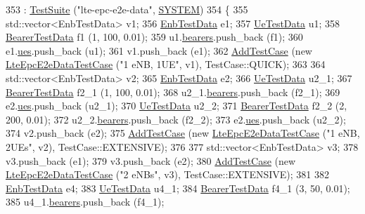 \begin{DoxyCode}
353   : \hyperlink{classns3_1_1TestSuite_a904b0c40583b744d30908aeb94636d1a}{TestSuite} (\textcolor{stringliteral}{"lte-epc-e2e-data"}, \hyperlink{classns3_1_1TestSuite_a1ebfcab34ec8161e085e8e3a1855eae0a90c5529a26ab3a5ffcc6e57040dbd82e}{SYSTEM})
354 \{  
355   std::vector<EnbTestData> v1;  
356   \hyperlink{structEnbTestData}{EnbTestData} e1;
357   \hyperlink{structUeTestData}{UeTestData} u1;
358   \hyperlink{structBearerTestData}{BearerTestData} f1 (1, 100, 0.01);
359   u1.\hyperlink{structUeTestData_ab02618dc9dfd673f397c313dae3df481}{bearers}.push\_back (f1);
360   e1.\hyperlink{structEnbTestData_a0b5de379df31368a33410980a16d2dd7}{ues}.push\_back (u1);
361   v1.push\_back (e1);
362   \hyperlink{classns3_1_1TestCase_a3718088e3eefd5d6454569d2e0ddd835}{AddTestCase} (\textcolor{keyword}{new} \hyperlink{classLteEpcE2eDataTestCase}{LteEpcE2eDataTestCase} (\textcolor{stringliteral}{"1 eNB, 1UE"}, v1), 
      TestCase::QUICK);
363 
364   std::vector<EnbTestData> v2;  
365   \hyperlink{structEnbTestData}{EnbTestData} e2;
366   \hyperlink{structUeTestData}{UeTestData} u2\_1;
367   \hyperlink{structBearerTestData}{BearerTestData} f2\_1 (1, 100, 0.01);
368   u2\_1.\hyperlink{structUeTestData_ab02618dc9dfd673f397c313dae3df481}{bearers}.push\_back (f2\_1);
369   e2.\hyperlink{structEnbTestData_a0b5de379df31368a33410980a16d2dd7}{ues}.push\_back (u2\_1);
370   \hyperlink{structUeTestData}{UeTestData} u2\_2;
371   \hyperlink{structBearerTestData}{BearerTestData} f2\_2 (2, 200, 0.01);
372   u2\_2.\hyperlink{structUeTestData_ab02618dc9dfd673f397c313dae3df481}{bearers}.push\_back (f2\_2);
373   e2.\hyperlink{structEnbTestData_a0b5de379df31368a33410980a16d2dd7}{ues}.push\_back (u2\_2);
374   v2.push\_back (e2);
375   \hyperlink{classns3_1_1TestCase_a3718088e3eefd5d6454569d2e0ddd835}{AddTestCase} (\textcolor{keyword}{new} \hyperlink{classLteEpcE2eDataTestCase}{LteEpcE2eDataTestCase} (\textcolor{stringliteral}{"1 eNB, 2UEs"}, v2), 
      TestCase::EXTENSIVE);
376 
377   std::vector<EnbTestData> v3;  
378   v3.push\_back (e1);
379   v3.push\_back (e2);
380   \hyperlink{classns3_1_1TestCase_a3718088e3eefd5d6454569d2e0ddd835}{AddTestCase} (\textcolor{keyword}{new} \hyperlink{classLteEpcE2eDataTestCase}{LteEpcE2eDataTestCase} (\textcolor{stringliteral}{"2 eNBs"}, v3), 
      TestCase::EXTENSIVE);
381 
382   \hyperlink{structEnbTestData}{EnbTestData} e4;
383   \hyperlink{structUeTestData}{UeTestData} u4\_1;
384   \hyperlink{structBearerTestData}{BearerTestData} f4\_1 (3, 50, 0.01);
385   u4\_1.\hyperlink{structUeTestData_ab02618dc9dfd673f397c313dae3df481}{bearers}.push\_back (f4\_1);

\end{DoxyCode}
